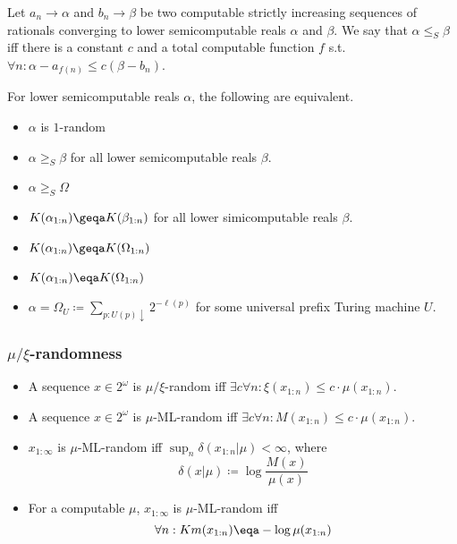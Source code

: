 \documentclass[UTF8,11pt,colorlinks,compress,openany]{beamer}%
\begin{document}
\begin{frame}\frametitle{}
\begin{definition}
Let $a_n\to\alpha$ and $b_n\to\beta$ be two computable strictly increasing sequences of rationals converging to lower semicomputable reals $\alpha$ and $\beta$. We say that $\alpha\leq_S\beta$ iff there is a constant $c$ and a total computable function $f$ s.t. $\forall n:\alpha-a_{f(n)}\leq c(\beta-b_n)$.
\end{definition}
\begin{theorem}
For lower semicomputable reals $\alpha$, the following are equivalent.
\begin{itemize}
	\item $\alpha$ is $1$-random
	\item $\alpha\geq_S\beta$ for all lower semicomputable reals $\beta$.
	\item $\alpha\geq_S\Omega$
	\item $K(\alpha_{1:n})\geqa K(\beta_{1:n})$ for all lower simicomputable reals $\beta$.
	\item $K(\alpha_{1:n})\geqa K(\Omega_{1:n})$
	\item $K(\alpha_{1:n})\eqa K(\Omega_{1:n})$
	\item $\alpha=\Omega_U\coloneqq \sum\limits_{p:U(p)\downarrow}2^{-\ell(p)}$ for some universal prefix Turing machine $U$.
\end{itemize}
\end{theorem}
\end{frame}

\begin{frame}\frametitle{$\mu/\xi$-randomness}
\begin{definition}[$\mu/\xi$-randomness]
\begin{itemize}
	\item A sequence $x\in 2^\omega$ is $\mu/\xi$-random iff $\exists c\forall n: \xi(x_{1:n})\leq c\cdot\mu(x_{1:n})$.
	\item A sequence $x\in 2^\omega$ is $\mu$-ML-random iff $\exists c\forall n: M(x_{1:n})\leq c\cdot\mu(x_{1:n})$.
\end{itemize}
\end{definition}
\begin{block}{}
\begin{itemize}
\item $x_{1:\infty}$ is $\mu$-ML-random iff $\sup_n\delta(x_{1:n}|\mu)<\infty$, where
\[\delta(x|\mu)\coloneqq \log\frac{M(x)}{\mu(x)}\]
\item For a computable $\mu$, $x_{1:\infty}$ is $\mu$-ML-random iff
\[\forall n: Km(x_{1:n})\eqa-\log\mu(x_{1:n})\]
\end{itemize}	
\end{block}
\end{frame}
\end{document}
